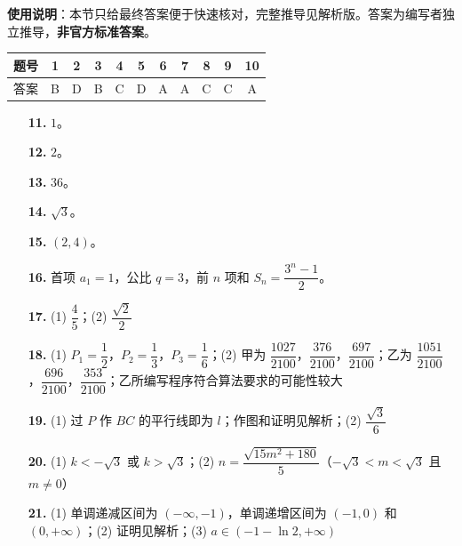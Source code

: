 
\begin{gknotice}
\textbf{使用说明}：本节只给最终答案便于快速核对，完整推导见解析版。答案为编写者独立推导，\textbf{非官方标准答案}。
\end{gknotice}

\begin{center}\begin{tabular}{ccccccccccc}
\toprule
题号 & 1 & 2 & 3 & 4 & 5 & 6 & 7 & 8 & 9 & 10 \\
\midrule
答案 & B & D & B & C & D & A & A & C & C & A \\
\bottomrule
\end{tabular}\end{center}

\begin{itemize}[leftmargin=2.6em]
  \item[\textbf{11.}] $1$。
  \item[\textbf{12.}] $2$。
  \item[\textbf{13.}] $36$。
  \item[\textbf{14.}] $\sqrt3$。
  \item[\textbf{15.}] $(2,4)$。
\end{itemize}

\begin{itemize}[leftmargin=2.6em]
  \item[\textbf{16.}] 首项 $a_1=1$，公比 $q=3$，前 $n$ 项和 $S_n=\dfrac{3^n-1}2$。
  \item[\textbf{17.}] (1) $\dfrac45$；(2) $\dfrac{\sqrt2}{2}$
  \item[\textbf{18.}] (1) $P_1=\dfrac12$，$P_2=\dfrac13$，$P_3=\dfrac16$；(2) 甲为 $\dfrac{1027}{2100}$，$\dfrac{376}{2100}$，$\dfrac{697}{2100}$；乙为 $\dfrac{1051}{2100}$，$\dfrac{696}{2100}$，$\dfrac{353}{2100}$；乙所编写程序符合算法要求的可能性较大
  \item[\textbf{19.}] (1) 过 $P$ 作 $BC$ 的平行线即为 $l$；作图和证明见解析；(2) $\dfrac{\sqrt3}{6}$
  \item[\textbf{20.}] (1) $k<-\sqrt3$ 或 $k>\sqrt3$；(2) $n=\dfrac{\sqrt{15m^2+180}}5$（$-\sqrt3<m<\sqrt3$ 且 $m\neq0$）
  \item[\textbf{21.}] (1) 单调递减区间为 $(-\infty,-1)$，单调递增区间为 $(-1,0)$ 和 $(0,+\infty)$；(2) 证明见解析；(3) $a\in(-1-\ln2,+\infty)$
\end{itemize}
